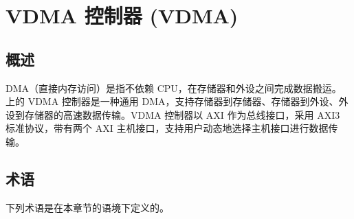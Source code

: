 \documentclass[main\_\_CN.tex]{subfiles}
\begin{document}

\ifglobal
\else
    {\let\clearpage\relax \listoftodos}
    {\let\clearpage\relax \listofdonetodos}
    \tableofcontents
\fi



\hypertarget{vdma}{}
\chapter{VDMA 控制器 (VDMA)}
\label{mod:vdma}


\section{概述}

DMA（直接内存访问）是指不依赖 CPU，在存储器和外设之间完成数据搬运。\chipname{} 上的 VDMA 控制器是一种通用 DMA，支持存储器到存储器、存储器到外设、外设到存储器的高速数据传输。VDMA 控制器以 AXI 作为总线接口，采用 AXI3 标准协议，带有两个 AXI 主机接口，支持用户动态地选择主机接口进行数据传输。


\section{术语}

下列术语是在本章节的语境下定义的。
\end{document}
